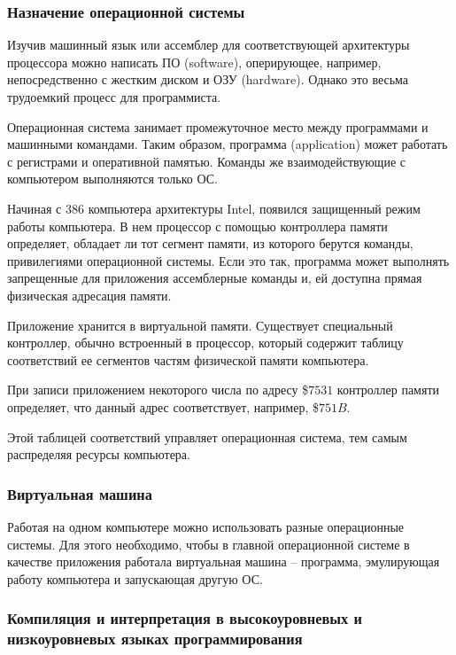 \subsubsection*{Назначение операционной системы}

Изучив машинный язык или ассемблер для соответствующей архитектуры процессора можно написать ПО (software), оперирующее, например, непосредственно с жестким диском и ОЗУ (hardware). Однако это весьма трудоемкий процесс для программиста. 

Операционная система занимает промежуточное место между программами и машинными командами. Таким образом, программа (application) может работать с регистрами и оперативной памятью. Команды же взаимодействующие с компьютером выполняются только ОС.

Начиная с 386 компьютера архитектуры Intel, появился защищенный режим работы компьютера. В нем процессор с помощью контроллера памяти определяет, обладает ли тот сегмент памяти, из которого берутся команды, привилегиями операционной системы. Если это так, программа может выполнять запрещенные для приложения ассемблерные команды и, ей доступна прямая физическая адресация памяти. 

Приложение хранится в виртуальной памяти. Существует специальный контроллер,
обычно встроенный в процессор, который содержит таблицу соответствий ее сегментов частям физической памяти компьютера.

\begin{example}
	
	При записи приложением некоторого числа по адресу \$$7531$ контроллер памяти определяет, что данный адрес соответствует, например, \$$751B$. 
\end{example}

Этой таблицей соответствий управляет операционная система, тем самым распределяя ресурсы компьютера.

\subsubsection*{Виртуальная машина} 

Работая на одном компьютере можно использовать разные операционные системы. Для этого необходимо, чтобы в главной операционной системе в качестве приложения работала виртуальная машина  – программа, эмулирующая работу компьютера и запускающая другую ОС. 

\subsubsection*{Компиляция и интерпретация в высокоуровневых и низкоуровневых языках программирования}

